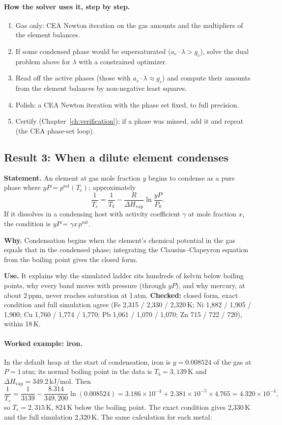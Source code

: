 \documentclass[11pt,a4paper]{article}
\begin{document}
\paragraph{How the solver uses it, step by step.}
\begin{enumerate}
\item Gas only: CEA Newton iteration on the gas amounts and the multipliers of the element balances.
\item If some condensed phase would be supersaturated ($a_c\cdot\lambda > g_c$), solve the dual problem above for $\lambda$ with a constrained optimizer.
\item Read off the active phases (those with $a_c\cdot\lambda \approx g_c$) and compute their amounts from the element balances by non-negative least squares.
\item Polish: a CEA Newton iteration with the phase set fixed, to full precision.
\item Certify (Chapter~\ref{ch:verification}); if a phase was missed, add it and repeat (the CEA phase-set loop).
\end{enumerate}

\subsection{Result 3: When a dilute element condenses}
\textbf{Statement.} An element at gas mole fraction $y$ begins to condense as a pure phase where $yP = p^{\mathrm{sat}}(T_c)$; approximately
\[
\frac{1}{T_c} = \frac{1}{T_b} - \frac{R}{\Delta H_{\mathrm{vap}}}\ln\frac{yP}{P_0}.
\]
If it dissolves in a condensing host with activity coefficient $\gamma$ at mole fraction $x$, the condition is $yP = \gamma x\, p^{\mathrm{sat}}$.

\textbf{Why.} Condensation begins when the element's chemical potential in the gas equals that in the condensed phase; integrating the Clausius--Clapeyron equation from the boiling point gives the closed form.

\textbf{Use.} It explains why the simulated ladder sits hundreds of kelvin below boiling points, why every band moves with pressure (through $yP$), and why mercury, at about 2\,ppm, never reaches saturation at 1\,atm. \textbf{Checked:} closed form, exact condition and full simulation agree (Fe 2,315 / 2,330 / 2,320\,K; Ni 1,882 / 1,905 / 1,900; Cu 1,760 / 1,774 / 1,770; Pb 1,061 / 1,070 / 1,070; Zn 715 / 722 / 720), within 18\,K.

\paragraph{Worked example: iron.} In the default heap at the start of condensation, iron is $y = 0.008524$ of the gas at $P = 1$\,atm; its normal boiling point in the data is $T_b = 3{,}139$\,K and $\Delta H_{\mathrm{vap}} = 349.2$\,kJ/mol. Then
\[
\frac{1}{T_c} = \frac{1}{3139} - \frac{8.314}{349{,}200}\ln(0.008524) = 3.186\times10^{-4} + 2.381\times10^{-5}\times 4.765 = 4.320\times10^{-4},
\]
so $T_c = 2{,}315$\,K, 824\,K below the boiling point. The exact condition gives 2,330\,K and the full simulation 2,320\,K. The same calculation for each metal:

\end{document}
